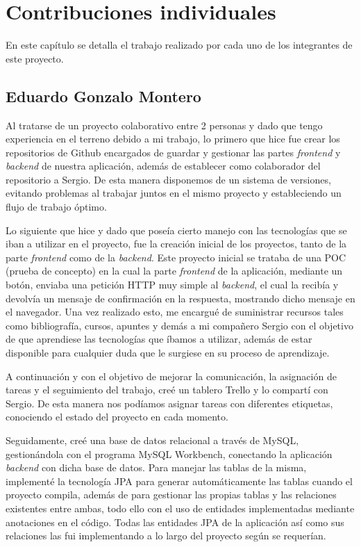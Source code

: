 \chapter{Contribuciones individuales}

En este capítulo se detalla el trabajo realizado por cada uno de los integrantes de este proyecto.

\section{Eduardo Gonzalo Montero}

Al tratarse de un proyecto colaborativo entre 2 personas y dado que tengo experiencia en el terreno debido a mi trabajo, lo primero que hice fue crear los repositorios de Github encargados de guardar y gestionar las partes \textit{frontend} y \textit{backend} de nuestra aplicación, además de establecer como colaborador del repositorio a Sergio. De esta manera disponemos de un sistema de versiones, evitando problemas al trabajar juntos en el mismo proyecto y estableciendo un flujo de trabajo óptimo. \newline

Lo siguiente que hice y dado que poseía cierto manejo con las tecnologías que se iban a utilizar en el proyecto, fue la creación inicial de los proyectos, tanto de la parte \textit{frontend} como de la  \textit{backend}. Este proyecto inicial se trataba de una POC (prueba de concepto) en la cual la parte \textit{frontend} de la aplicación, mediante un botón, enviaba una petición HTTP muy simple al \textit{backend}, el cual la recibía y devolvía un mensaje de confirmación en la respuesta, mostrando dicho mensaje en el navegador. Una vez realizado esto, me encargué de suministrar recursos tales como bibliografía, cursos, apuntes y demás a mi compañero Sergio con el objetivo de que aprendiese las tecnologías que íbamos a utilizar, además de estar disponible para cualquier duda que le surgiese en su proceso de aprendizaje. \newline

A continuación y con el objetivo de mejorar la comunicación, la asignación de tareas y el seguimiento del trabajo, creé un tablero Trello y lo compartí con Sergio. De esta manera nos podíamos asignar tareas con diferentes etiquetas, conociendo el estado del proyecto en cada momento. \newline

Seguidamente, creé una base de datos relacional a través de MySQL, gestionándola con el programa MySQL Workbench, conectando la aplicación \textit{backend} con dicha base de datos. Para manejar las tablas de la misma, implementé la tecnología JPA para generar automáticamente las tablas cuando el proyecto compila, además de para gestionar las propias tablas y las relaciones existentes entre ambas, todo ello con el uso de  entidades implementadas mediante anotaciones en el código. Todas las entidades JPA de la aplicación así como sus relaciones las fui implementando a lo largo del proyecto según se requerían. \newline

